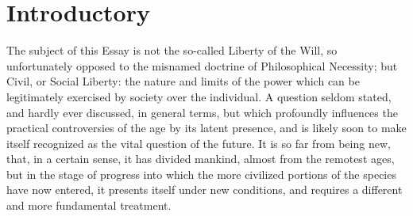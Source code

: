 \documentclass[12pt]{report}
\begin{document}
\chapter{Introductory}
The subject of this Essay is not the so-called Liberty of the Will, so unfortunately opposed to the misnamed doctrine of Philosophical Necessity; but Civil, or Social Liberty: the nature and limits of the power which can be legitimately exercised by society over the individual. A question seldom stated, and hardly ever discussed, in general terms, but which profoundly influences the practical controversies of the age by its latent presence, and is likely soon to make itself recognized as the vital question of the future. It is so far from being new, that, in a certain sense, it has divided mankind, almost from the remotest ages, but in the stage of progress into which the more civilized portions of the species have now entered, it presents itself under new conditions, and requires a different and more fundamental treatment.
\end{document}
